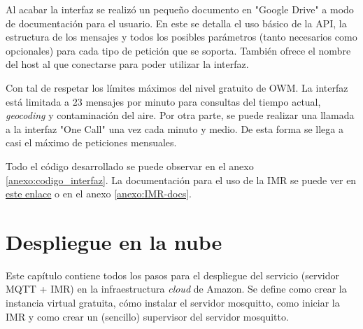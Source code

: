 \documentclass{scrbook}
\begin{document}
Al acabar la interfaz se realizó un pequeño documento en "Google Drive" a modo de documentación para el usuario. En este se detalla el uso básico de la API, la estructura de los mensajes y todos los posibles parámetros (tanto necesarios como opcionales) para cada tipo de petición que se soporta. También ofrece el nombre del host al que conectarse para poder utilizar la interfaz.

Con tal de respetar los límites máximos del nivel gratuito de OWM. La interfaz está limitada a 23 mensajes por minuto para consultas del tiempo actual, \textit{geocoding} y contaminación del aire. Por otra parte, se puede realizar una llamada a la interfaz "One Call" una vez cada minuto y medio. De esta forma se llega a casi el máximo de peticiones mensuales.

Todo el código desarrollado se puede observar en el anexo \ref{anexo:codigo_interfaz}. La documentación para el uso de la IMR se puede ver en \href{http://shorturl.at/akyES}{este enlace} o en el anexo \ref{anexo:IMR-docs}.

\chapter{Despliegue en la nube}
\label{cap:despliegue_cloud}

Este capítulo contiene todos los pasos para el despliegue del servicio (servidor MQTT + IMR) en la infraestructura \textit{cloud} de Amazon. Se define como crear la instancia virtual gratuita, cómo instalar el servidor mosquitto, como iniciar la IMR y como crear un (sencillo) supervisor del servidor mosquitto.
\end{document}
